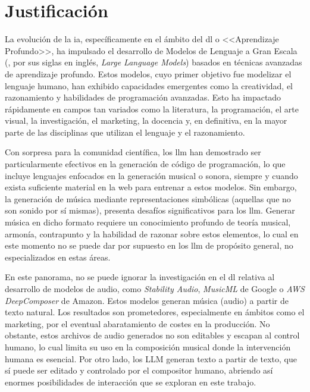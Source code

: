 \chapter{Justificación}


La evolución de la \gls{ia}, específicamente en el ámbito del \gls{dl} o <<Aprendizaje Profundo>>, ha impulsado el desarrollo de Modelos de Lenguaje a Gran Escala (, por sus siglas en inglés, \textit{Large Language Models}) basados en técnicas avanzadas de aprendizaje profundo. Estos modelos, cuyo primer objetivo fue modelizar el lenguaje humano, han exhibido capacidades emergentes como la creatividad, el razonamiento y habilidades de programación avanzadas. Esto ha impactado rápidamente en campos tan variados como la literatura, la programación, el arte visual, la investigación, el marketing, la docencia y, en definitiva, en la mayor parte de las disciplinas que utilizan el lenguaje y el razonamiento.

Con sorpresa para la comunidad científica, los \gls{llm} han demostrado ser particularmente efectivos en la generación de código de programación, lo que incluye lenguajes enfocados en la generación musical o sonora, siempre y cuando exista suficiente material en la web para entrenar a estos modelos. Sin embargo, la generación de música mediante representaciones simbólicas (aquellas que no son sonido por sí mismas), presenta desafíos significativos para los \gls{llm}. Generar música en dicho formato requiere un conocimiento profundo de teoría musical, armonía, contrapunto y la habilidad de razonar sobre estos elementos, lo cual en este momento no se puede dar por supuesto en los \gls{llm} de propósito general, no especializados en estas áreas.

En este panorama, no se puede ignorar la investigación en el \gls{dl} relativa al desarrollo de modelos de audio, como \textit{Stability Audio}, \textit{MusicML} de Google o \textit{AWS DeepComposer} de Amazon. Estos modelos generan música (audio) a partir de texto natural. Los resultados son prometedores, especialmente en ámbitos como el marketing, por el eventual abaratamiento de costes en la producción. No obstante, estos archivos de audio generados no son editables y escapan al control humano, lo cual limita su uso en la composición musical donde la intervención humana es esencial. Por otro lado, los LLM generan texto a partir de texto, que sí puede ser editado y controlado por el compositor humano, abriendo así enormes posibilidades de interacción que se exploran en este trabajo.

